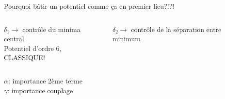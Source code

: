 \documentclass[handout]{beamer}
\begin{document}
\begin{frame}
Pourquoi bâtir un potentiel comme ça en premier lieu?!?!\\


\begin{columns}
    \begin{column}{.5\linewidth}
   \begin{figure}[0.3\textwidth]
    \end{figure}
   $\delta_1 \rightarrow$ contrôle du minima central\\
    Potentiel d'ordre 6, CLASSIQUE!\\    
    \end{column}
    \begin{column}{.5\linewidth}
    \begin{figure}[0.3\textwidth]
    \end{figure}
   $\delta_2 \rightarrow$ contrôle de la séparation entre minimum \\
    \end{column}
  \end{columns}
 $\alpha$: importance 2ème terme \\
 $\gamma$: importance couplage \\
\end{frame}
\end{document}
